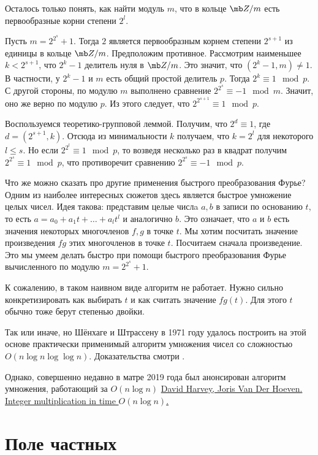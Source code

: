 Осталось только понять, как найти модуль $m$, что в кольце $\mb Z/m$ есть первообразные корни степени $2^l$.


\utv Пусть $m=2^{2^s}+1$. Тогда $2$ является первообразным корнем степени $2^{s+1}$ из единицы в кольце $\mb Z/m$. 
\eutv
\proof Предположим противное. Рассмотрим наименьшее $k<2^{s+1}$, что $2^k-1$ делитель нуля в $\mb Z/m$. Это значит, что $(2^k-1,m)\neq 1$. В частности, у $2^k-1$ и $m$ есть общий простой делитель $p$. Тогда $2^k\equiv 1 \mod p$. С другой стороны, по модулю $m$ выполнено сравнение $2^{2^s}\equiv -1 \mod m$. Значит, оно же верно по модулю $p$. Из этого следует, что $2^{2^{s+1}}\equiv 1 \mod p$.

Воспользуемся теоретико-групповой леммой. Получим, что $2^d\equiv 1$, где $d=(2^{s+1},k)$. Отсюда из минимальности $k$ получаем, что $k=2^l$ для некоторого $l\leq s$. Но если $2^{2^l} \equiv 1 \mod p$, то возведя несколько раз в квадрат получим $2^{2^s}\equiv 1 \mod p$, что противоречит сравнению $2^{2^s}\equiv -1\mod p$.   
\endproof

Что же можно сказать про другие применения быстрого преобразования Фурье? Одним из наиболее интересных сюжетов здесь является быстрое умножение целых чисел. Идея такова: представим целые  числa  $a,b$ в записи по основанию $t$, то есть $a=a_0+a_1t+\dots+a_lt^l$ и аналогично $b$. Это означает, что $a$ и $b$ есть значения некоторых многочленов $f,g$ в точке $t$. Мы хотим посчитать значение  произведения $fg$ этих многочленов в точке $t$. Посчитаем сначала произведение. Это мы умеем делать быстро при помощи быстрого преобразования Фурье вычисленного по модулю $m=2^{2^s}+1$. 

К сожалению, в таком наивном виде алгоритм не работает. Нужно сильно конкретизировать как выбирать $t$ и как считать значение $fg(t)$. Для этого $t$ обычно тоже берут степенью двойки.

Так или иначе, но Шёнхаге и Штрассену в 1971 году удалось построить на этой основе практически применимый алгоритм умножения чисел со сложностью $O(n\log n \log\log n)$. Доказательства смотри \cite[стр. 270]{AHU}.


Однако, совершенно недавно в матре 2019 года был анонсирован алгоритм умножения, работающий за $O(n\log n)$ \href{https://hal.archives-ouvertes.fr/hal-02070778/document}{David Harvey, Joris Van Der Hoeven. Integer multiplication in time $O(n \log n)$.}




\section{Поле частных}

